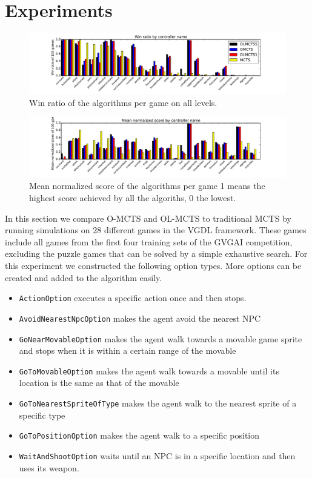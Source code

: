 \section{Experiments}
\label{sec:experiments}
\begin{figure}
	\centering
	\includegraphics[width=\textwidth]{includes/wins}
	\vspace{-.8cm}
	\caption{Win ratio of the algorithms per game on all levels.}
	\label{fig:wins}
\end{figure}

\begin{figure}
	\centering
	\includegraphics[width=\textwidth]{includes/scores}
	\vspace{-.8cm}
	\caption{Mean normalized score of the algorithms per game 1 means the
	highest score achieved by all the algoriths, 0 the lowest.}
	\label{fig:scores}
\end{figure}


In this section we compare O-MCTS and OL-MCTS to traditional MCTS by running
simulations on 28 different games in the VGDL framework. These games include all
games from the first four training sets of the GVGAI competition, excluding the
puzzle games that can be solved by a simple exhaustive search. For this
experiment we constructed the following option types. More options can be
created and added to the algorithm easily.

\begin{itemize}[noitemsep]
	\item \texttt{ActionOption} executes a specific action once and then
		stops.
	\item \texttt{AvoidNearestNpcOption} makes the agent avoid the nearest NPC
	\item \texttt{GoNearMovableOption} makes the agent walk towards a
		movable game sprite and stops when it is within a certain range of the
		movable
	\item \texttt{GoToMovableOption} makes the agent walk towards a
		movable until its location is the same as that of the movable
	\item \texttt{GoToNearestSpriteOfType} makes the agent walk to the nearest sprite of
		a specific type
	\item \texttt{GoToPositionOption} makes the agent walk to a specific position
	\item \texttt{WaitAndShootOption} waits until an NPC is in a specific location and
		then uses its weapon.
\end{itemize}

